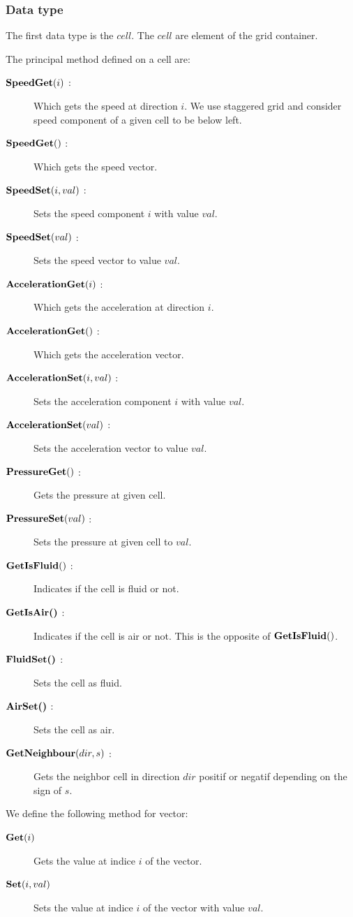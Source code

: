 \subsubsection{Data type}

The first data type is the $cell$. The $cell$ are element of the grid container.

The principal method defined on a cell are:
\begin{description}
 \item[$\mathop{\textbf{SpeedGet}}(i)$ :] Which gets the speed at direction $i$. We use staggered grid and consider speed component of a given cell
 to be below left.
  \item[$\mathop{\textbf{SpeedGet}}()$ :] Which gets the speed vector.
 \item[$\mathop{\textbf{SpeedSet}}(i,val)$ :] Sets the speed component $i$ with value $val$.
 \item[$\mathop{\textbf{SpeedSet}}(val)$ :] Sets the speed vector to value $val$.
 \item[$\mathop{\textbf{AccelerationGet}}(i)$ :] Which gets the acceleration at direction $i$.
 \item[$\mathop{\textbf{AccelerationGet}}()$ :] Which gets the acceleration vector.
 \item[$\mathop{\textbf{AccelerationSet}}(i,val)$ :] Sets the acceleration component $i$ with value $val$.
 \item[$\mathop{\textbf{AccelerationSet}}(val)$ :] Sets the acceleration vector to value $val$.
 \item[$\mathop{\textbf{PressureGet}}()$ :] Gets the pressure at given cell.
 \item[$\mathop{\textbf{PressureSet}}(val)$ :] Sets the pressure at given cell to $val$.
 \item[$\mathop{\textbf{GetIsFluid}}()$ :] Indicates if the cell is fluid or not.
 \item[$\mathop{\textbf{GetIsAir()}}$ :] Indicates if the cell is air or not. This is the opposite of $\mathop{\textbf{GetIsFluid}}()$.
 \item[$\mathop{\textbf{FluidSet()}}$ :] Sets the cell as fluid.
 \item[$\mathop{\textbf{AirSet()}}$ :] Sets the cell as air.
 \item[$\mathop{\textbf{GetNeighbour}}(dir,s)$ :] Gets the neighbor cell in direction $dir$ positif or negatif depending on the sign of $s$.
\end{description}

We define the following method for vector:
\begin{description}
 \item[$\mathop{\textbf{Get}}(i)$] Gets the value at indice $i$ of the vector.
  \item[$\mathop{\textbf{Set}}(i,val)$] Sets the value at indice $i$ of the vector with value $val$.
\end{description}


